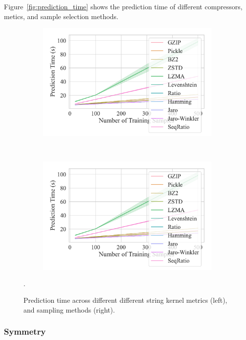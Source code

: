 Figure~\ref{fig:prediction_time} shows the prediction time of different compressors, metics, and sample selection methods.
\begin{figure}
	\begin{subfigure}
		\centering
		\includegraphics[width=.46\textwidth]{figs/kdd_nsl/metric_vs_predict_time.pdf}
	\end{subfigure}
	~
	\begin{subfigure}
		\centering
		\includegraphics[width=.46\textwidth]{figs/kdd_nsl/metric_vs_predict_time.pdf}
	\end{subfigure}
	\caption{Prediction time across different different string kernel metrics (left), and sampling methods (right).}.
	\label{fig:prediction_time_kdd}
\end{figure}

\subsubsection{Symmetry}



